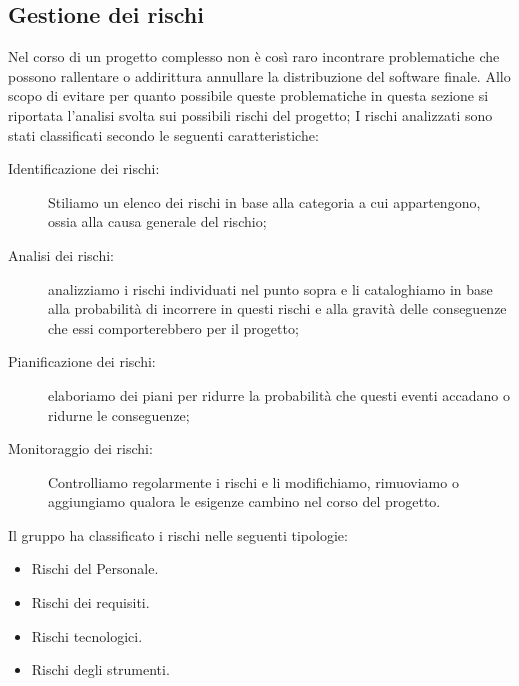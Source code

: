 \documentclass[../piano-di-progetto.tex]{subfiles}
\begin{document}
	\subsection{Gestione dei rischi}%
  \label{sub:gestione_dei_rischi}
  Nel corso di un progetto complesso non è così raro incontrare problematiche che possono rallentare o addirittura annullare la distribuzione del software finale.
  Allo scopo di evitare per quanto possibile queste problematiche in questa sezione si riportata l'analisi svolta sui possibili rischi del progetto; I rischi analizzati sono stati classificati secondo le seguenti caratteristiche:
  \begin{description}
      \item[Identificazione dei rischi:] Stiliamo un elenco dei rischi in base alla categoria a cui appartengono, ossia alla causa generale del rischio;
      \item[Analisi dei rischi:] analizziamo i rischi individuati nel punto sopra e li cataloghiamo in base alla probabilità di incorrere in questi rischi e alla gravità delle conseguenze che essi comporterebbero per il progetto;
      \item[Pianificazione dei rischi:] elaboriamo dei piani per ridurre la probabilità che questi eventi accadano o ridurne le conseguenze;
      \item[Monitoraggio dei rischi:] Controlliamo regolarmente i rischi e li modifichiamo, rimuoviamo o aggiungiamo qualora le esigenze cambino nel corso del progetto.
    \end{description}
    Il gruppo ha classificato i rischi nelle seguenti tipologie:
    \begin{itemize}
      \item Rischi del Personale.
      \item Rischi dei requisiti.
      \item Rischi tecnologici.
      \item Rischi degli strumenti.
    \end{itemize}
\end{document}
